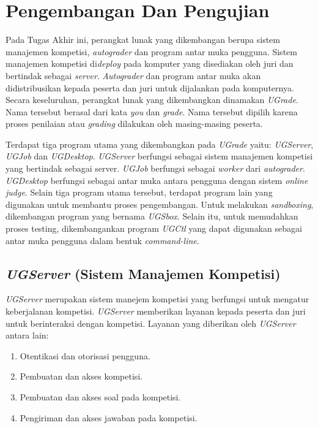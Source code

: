 \chapter{Pengembangan Dan Pengujian}

\par Pada Tugas Akhir ini, perangkat lunak yang dikembangan berupa sistem manajemen kompetisi, \textit{autograder} dan program antar muka pengguna.  Sistem manajemen kompetisi di\textit{deploy} pada komputer yang disediakan oleh juri dan bertindak sebagai \textit{server}. \textit{Autograder} dan program antar muka akan didistribusikan kepada peserta dan juri untuk dijalankan pada komputernya. Secara keseluruhan, perangkat lunak yang dikembangkan dinamakan \textit{UGrade}. Nama tersebut berasal dari kata \textit{you} dan \textit{grade}. Nama tersebut dipilih karena proses penilaian atau \textit{grading} dilakukan oleh masing-masing peserta.

\par Terdapat tiga program utama yang dikembangkan pada \textit{UGrade} yaitu: \textit{UGServer}, \textit{UGJob} dan \textit{UGDesktop}. \textit{UGServer} berfungsi sebagai sistem manajemen kompetisi yang bertindak sebagai server. \textit{UGJob} berfungsi sebagai \textit{worker} dari \textit{autograder}. \textit{UGDesktop} berfungsi sebagai antar muka antara pengguna dengan sistem \textit{online judge}. Selain tiga program utama tersebut, terdapat program lain yang digunakan untuk membantu proses pengembangan. Untuk melakukan \textit{sandboxing}, dikembangan program yang bernama \textit{UGSbox}. Selain itu, untuk memudahkan proses testing, dikembangankan program \textit{UGCtl} yang dapat digunakan sebagai antar muka pengguna dalam bentuk \textit{command-line}.

\section{\textit{UGServer} (Sistem Manajemen Kompetisi)}

\par \textit{UGServer} merupakan sistem manejem kompetisi yang berfungsi untuk mengatur keberjalanan kompetisi. \textit{UGServer} memberikan layanan kepada peserta dan juri untuk berinteraksi dengan kompetisi. Layanan yang diberikan oleh \textit{UGServer} antara lain:
\begin{enumerate}
  \item Otentikasi dan otorisasi pengguna.
  \item Pembuatan dan akses kompetisi.
  \item Pembuatan dan akses soal pada kompetisi.
  \item Pengiriman dan akses jawaban pada kompetisi.
\end{enumerate}

